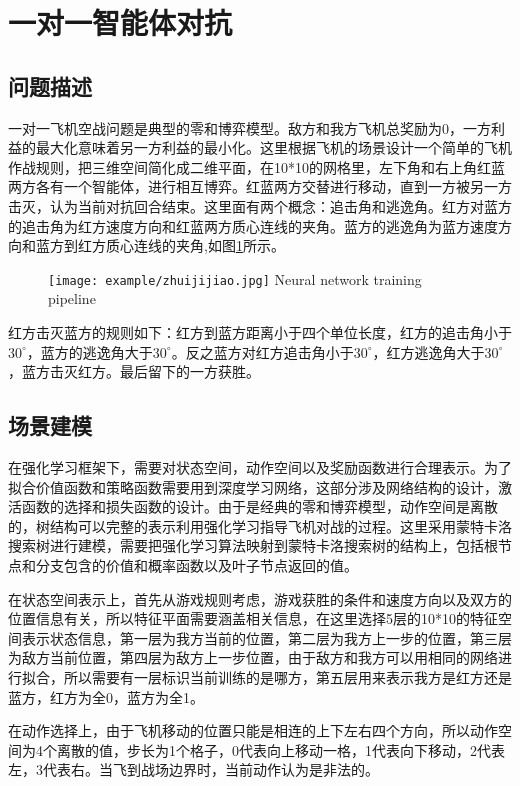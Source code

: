 \section{一对一智能体对抗}
\subsection{问题描述}
一对一飞机空战问题是典型的零和博弈模型。敌方和我方飞机总奖励为0，一方利益的最大化意味着另一方利益的最小化。这里根据飞机的场景设计一个简单的飞机作战规则，把三维空间简化成二维平面，在10*10的网格里，左下角和右上角红蓝两方各有一个智能体，进行相互博弈。红蓝两方交替进行移动，直到一方被另一方击灭，认为当前对抗回合结束。这里面有两个概念：追击角和逃逸角。红方对蓝方的追击角为红方速度方向和红蓝两方质心连线的夹角。蓝方的逃逸角为蓝方速度方向和蓝方到红方质心连线的夹角,如图\ref{fig:zhuijijiao}所示。
\begin{figure}[!htp]
	\centering
	\texttt{[image: example/zhuijijiao.jpg]}
	{Neural network training pipeline}
	\label{fig:zhuijijiao}
\end{figure}

红方击灭蓝方的规则如下：红方到蓝方距离小于四个单位长度，红方的追击角小于$30^\circ$，蓝方的逃逸角大于$30^\circ$。反之蓝方对红方追击角小于$30^\circ$，红方逃逸角大于$30^\circ$，蓝方击灭红方。最后留下的一方获胜。

\subsection{场景建模}
在强化学习框架下，需要对状态空间，动作空间以及奖励函数进行合理表示。为了拟合价值函数和策略函数需要用到深度学习网络，这部分涉及网络结构的设计，激活函数的选择和损失函数的设计。由于是经典的零和博弈模型，动作空间是离散的，树结构可以完整的表示利用强化学习指导飞机对战的过程。这里采用蒙特卡洛搜索树进行建模，需要把强化学习算法映射到蒙特卡洛搜索树的结构上，包括根节点和分支包含的价值和概率函数以及叶子节点返回的值。

在状态空间表示上，首先从游戏规则考虑，游戏获胜的条件和速度方向以及双方的位置信息有关，所以特征平面需要涵盖相关信息，在这里选择5层的10*10的特征空间表示状态信息，第一层为我方当前的位置，第二层为我方上一步的位置，第三层为敌方当前位置，第四层为敌方上一步位置，由于敌方和我方可以用相同的网络进行拟合，所以需要有一层标识当前训练的是哪方，第五层用来表示我方是红方还是蓝方，红方为全0，蓝方为全1。

在动作选择上，由于飞机移动的位置只能是相连的上下左右四个方向，所以动作空间为4个离散的值，步长为1个格子，0代表向上移动一格，1代表向下移动，2代表左，3代表右。当飞到战场边界时，当前动作认为是非法的。

